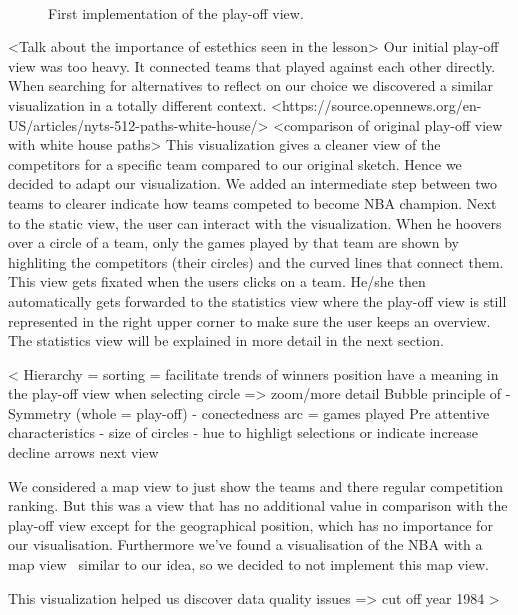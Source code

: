\documentclass{sigchi}
\begin{document}
\begin{figure}
\centering
  \missingfigure{}
  \caption{First implementation of the play-off view.}~\label{fig:firstimplementationplayoffview}
\end{figure}

<Talk about the importance of estethics seen in the lesson>
Our initial play-off view was too heavy. It connected teams that played against
each other directly. When searching for alternatives to reflect on our choice we
discovered a similar visualization in a totally different context. 
<https://source.opennews.org/en-US/articles/nyts-512-paths-white-house/>
<comparison of original play-off view with white house paths>
This visualization gives a cleaner view of the competitors for a specific team
compared to our original sketch. Hence we decided to adapt our visualization. We
added an intermediate step between two teams to clearer indicate how teams competed
to become NBA champion.
Next to the static view, the user can interact with the visualization. When he 
hoovers over a circle of a team, only the games played by that team are shown by highliting the 
competitors (their circles) and the curved lines that connect them. This view gets 
fixated when the users clicks on a team.
He/she then automatically gets forwarded to the statistics view where the play-off 
view is still represented in the right upper corner to make sure the user keeps
an overview. The statistics view will be explained in more detail in the next section.


< Hierarchy = sorting = facilitate trends of winners
position have a meaning in the play-off view
when selecting circle => zoom/more detail
Bubble principle of 
- Symmetry (whole = play-off)
- conectedness arc = games played
Pre attentive characteristics
- size of circles
- hue to highligt selections or indicate increase decline arrows next view

We considered a map view to just show the teams and there regular competition
ranking. But this was a view that has no additional value in comparison with
the play-off view except for the geographical position, which has no importance
for our visualisation. Furthermore we've found a visualisation of the NBA with
a map view~\cite{mapviewvisualization} similar to our idea, so we decided to
not implement this map view. 

This visualization helped us discover data quality issues => cut off year 1984
>
\end{document}
